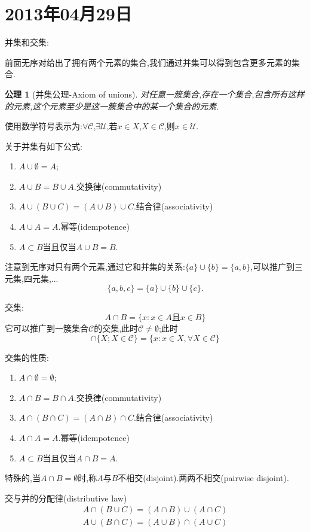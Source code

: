 \documentclass[12pt,a4paper,openany]{book}
\newtheorem{axiom}{公理}[section]
\begin{document}
\section{2013年04月29日}
并集和交集:

前面无序对给出了拥有两个元素的集合,我们通过并集可以得到包含更多元素的集合.

\begin{axiom}[并集公理-Axiom of unions]
对任意一簇集合,存在一个集合,包含所有这样的元素,这个元素至少是这一簇集合中的某一个集合的元素.
\end{axiom}

使用数学符号表示为:$\forall \mathscr{C}$,$\exists \mathscr{U}$,若$x \in X$,$X \in \mathscr{C}$,则$x \in \mathscr{U}$.

关于并集有如下公式:
\begin{enumerate}
\item $A \cup \emptyset = A$;
\item $A \cup B = B \cup A$.交换律(commutativity)
\item $A \cup (B \cup C) = (A \cup B) \cup C$.结合律(associativity)
\item $A \cup A = A$.幂等(idempotence)
\item $A \subset B$当且仅当$A \cup B = B$.
\end{enumerate}

注意到无序对只有两个元素,通过它和并集的关系:$\{a\} \cup \{b\} = \{a,b\}$,可以推广到三元集,四元集,...
\[
\{a,b,c\}=\{a\}\cup\{b\}\cup\{c\}.
\]

交集:
\[
A \cap B = \{x : x \in A \text{且} x \in B\}
\]
它可以推广到一簇集合$\mathscr{C}$的交集,此时$\mathscr{C} \neq \emptyset$;此时
\[
\cap\{X; X \in \mathscr{C}\} = \{x: x \in X, \forall X \in \mathscr{C}\}
\]

交集的性质:
\begin{enumerate}
\item $A \cap \emptyset = \emptyset$;
\item $A \cap B = B \cap A$.交换律(commutativity)
\item $A \cap (B \cap C) = (A \cap B) \cap C$.结合律(associativity)
\item $A \cap A = A$.幂等(idempotence)
\item $A \subset B$当且仅当$A \cap B = A$.
\end{enumerate}

特殊的,当$A \cap B = \emptyset$时,称$A$与$B$不相交(disjoint).两两不相交(pairwise disjoint).

交与并的分配律(distributive law)
\begin{gather*}
A \cap (B \cup C) = (A \cap B) \cup (A \cap C)\\
A \cup (B \cap C) = (A \cup B) \cap (A \cup C)
\end{gather*}
\end{document}
